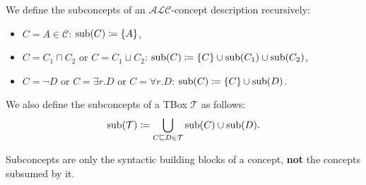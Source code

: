 \begin{mdframed}[frametitle={Subconcepts in $\mathcal{ALC}$}]
	We define the subconcepts of an $\mathcal{ALC}$-concept description recursively:
	\begin{itemize}
		\item $C = A \in \mathscr{C}$: $\operatorname{\text{sub}}(C) \coloneqq \left\{ A \right\}$,
		\item $C = C_1 \sqcap C_2$ or $C = C_1 \sqcup C_2$: $\operatorname{\text{sub}}(C) \coloneqq \left\{ C \right\} \cup \operatorname{\text{sub}}(C_1) \cup \operatorname{\text{sub}}(C_2)$,
		\item $C = \neg D$ or $C = \exists r.D$ or $C = \forall r.D$: $\operatorname{\text{sub}}(C) \coloneqq \left\{ C \right\} \cup \operatorname{\text{sub}}(D)$.
	\end{itemize}
	We also define the subconcepts of a TBox $\mathcal{T}$ as follows:
	\[
		\func{sub}(\mathcal{T}) \coloneqq \bigcup_{C \sqsubseteq D \in \mathcal{T}} \func{sub}(C) \cup \func{sub}(D)
	.\]
\end{mdframed}
\begin{note}
	Subconcepts are only the syntactic building blocks of a concept, \textbf{not} the concepts subsumed by it.
\end{note}

